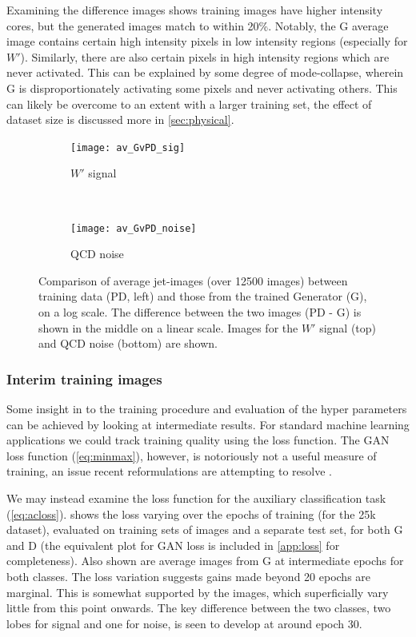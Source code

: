 \documentclass[twocolumn]{article}
\begin{document}
Examining the difference images shows training images have higher intensity cores, but the generated images match to within 20\%. Notably, the G average image contains certain high intensity pixels in low intensity regions (especially for $W'$). Similarly, there are also certain pixels in high intensity regions which are never activated. This can be explained by some degree of mode-collapse, wherein G is disproportionately activating some pixels and never activating others. This can likely be overcome to an extent with a larger training set, the effect of dataset size is discussed more in \cref{sec:physical}.  

\begin{figure}[!htbp]
	\centering
	\begin{subfigure}[t]{1.0\textwidth}
		\centering
		\texttt{[image: av\_GvPD\_sig]}
		\caption{$W'$ signal}
	\end{subfigure}%
	\\
	\begin{subfigure}[t]{1.0\textwidth}
		\centering
		\texttt{[image: av\_GvPD\_noise]}
		\caption{QCD noise}
	\end{subfigure}
	
	\caption{Comparison of average jet-images (over \num{12500} images) between training data (PD, left) and those from the trained Generator (G), on a log scale. The difference between the two images (PD - G) is shown in the middle on a linear scale. Images for the $W'$ signal (top) and QCD noise (bottom) are shown.}
	\label{fig:pdvg}
\end{figure}


\subsubsection{Interim training images}
Some insight in to the training procedure and evaluation of the hyper parameters can be achieved by looking at intermediate results. For standard machine learning applications we could track training quality using the loss function. The GAN loss function (\cref{eq:minmax}), however, is notoriously not a useful measure of training, an issue recent reformulations are attempting to resolve \cite{wasserstein}.

We may instead examine the loss function for the auxiliary classification task (\cref{eq:acloss}).  shows the loss varying over the epochs of training (for the 25k dataset), evaluated on training sets of images and a separate test set, for both G and D (the equivalent plot for GAN loss is included in \cref{app:loss} for completeness). Also shown are average images from G at intermediate epochs for both classes. The loss variation suggests gains made beyond 20 epochs are marginal. This is somewhat supported by the images, which superficially vary little from this point onwards. The key difference between the two classes, two lobes for signal and one for noise, is seen to develop at around epoch 30. 
\end{document}
